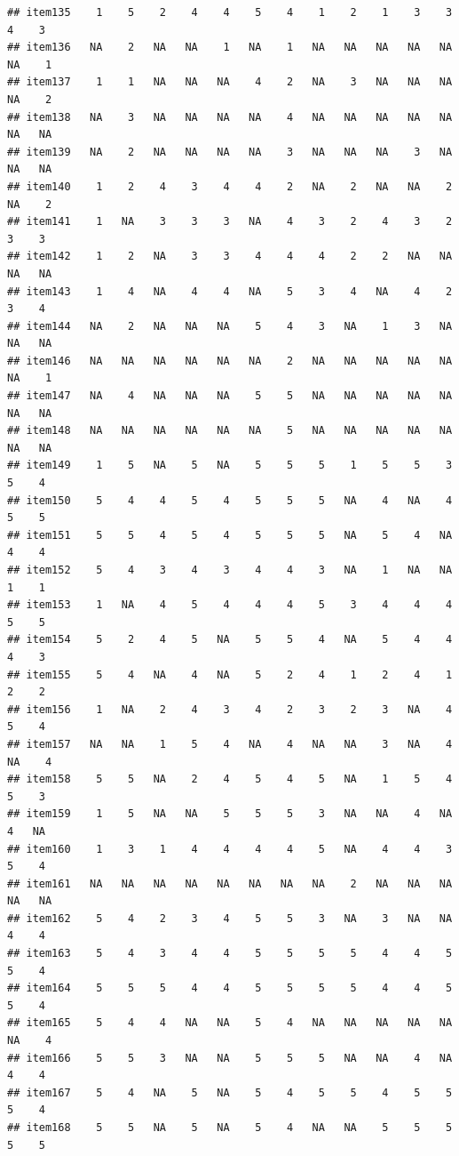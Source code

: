\documentclass[
  man]{apa6}
\begin{document}
\begin{verbatim}
## item135    1    5    2    4    4    5    4    1    2    1    3    3    4    3
## item136   NA    2   NA   NA    1   NA    1   NA   NA   NA   NA   NA   NA    1
## item137    1    1   NA   NA   NA    4    2   NA    3   NA   NA   NA   NA    2
## item138   NA    3   NA   NA   NA   NA    4   NA   NA   NA   NA   NA   NA   NA
## item139   NA    2   NA   NA   NA   NA    3   NA   NA   NA    3   NA   NA   NA
## item140    1    2    4    3    4    4    2   NA    2   NA   NA    2   NA    2
## item141    1   NA    3    3    3   NA    4    3    2    4    3    2    3    3
## item142    1    2   NA    3    3    4    4    4    2    2   NA   NA   NA   NA
## item143    1    4   NA    4    4   NA    5    3    4   NA    4    2    3    4
## item144   NA    2   NA   NA   NA    5    4    3   NA    1    3   NA   NA   NA
## item146   NA   NA   NA   NA   NA   NA    2   NA   NA   NA   NA   NA   NA    1
## item147   NA    4   NA   NA   NA    5    5   NA   NA   NA   NA   NA   NA   NA
## item148   NA   NA   NA   NA   NA   NA    5   NA   NA   NA   NA   NA   NA   NA
## item149    1    5   NA    5   NA    5    5    5    1    5    5    3    5    4
## item150    5    4    4    5    4    5    5    5   NA    4   NA    4    5    5
## item151    5    5    4    5    4    5    5    5   NA    5    4   NA    4    4
## item152    5    4    3    4    3    4    4    3   NA    1   NA   NA    1    1
## item153    1   NA    4    5    4    4    4    5    3    4    4    4    5    5
## item154    5    2    4    5   NA    5    5    4   NA    5    4    4    4    3
## item155    5    4   NA    4   NA    5    2    4    1    2    4    1    2    2
## item156    1   NA    2    4    3    4    2    3    2    3   NA    4    5    4
## item157   NA   NA    1    5    4   NA    4   NA   NA    3   NA    4   NA    4
## item158    5    5   NA    2    4    5    4    5   NA    1    5    4    5    3
## item159    1    5   NA   NA    5    5    5    3   NA   NA    4   NA    4   NA
## item160    1    3    1    4    4    4    4    5   NA    4    4    3    5    4
## item161   NA   NA   NA   NA   NA   NA   NA   NA    2   NA   NA   NA   NA   NA
## item162    5    4    2    3    4    5    5    3   NA    3   NA   NA    4    4
## item163    5    4    3    4    4    5    5    5    5    4    4    5    5    4
## item164    5    5    5    4    4    5    5    5    5    4    4    5    5    4
## item165    5    4    4   NA   NA    5    4   NA   NA   NA   NA   NA   NA    4
## item166    5    5    3   NA   NA    5    5    5   NA   NA    4   NA    4    4
## item167    5    4   NA    5   NA    5    4    5    5    4    5    5    5    4
## item168    5    5   NA    5   NA    5    4   NA   NA    5    5    5    5    5

\end{verbatim}
\end{document}
